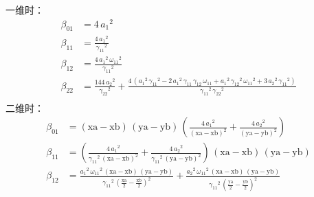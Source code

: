 \documentclass{book}
\begin{document}
一维时：
\begin{equation}
  \begin{aligned}
    \beta_{01} & = 4\,{a_1 }^2                                                                                                                                                                                                                                                                 \\
    \beta_{11} & = \frac{4\,{a_1 }^2 }{{\gamma_{11} }^2 }                                                                                                                                                                                                                                      \\
    \beta_{12} & = \frac{4\,{a_1 }^2 \,{\omega_{11} }^2 }{{\gamma_{11} }^2 }                                                                                                                                                                                                                   \\
    \beta_{22} & = \frac{144\,{a_2 }^2 }{{\gamma_{22} }^2 }+\frac{4\,{\left({a_1 }^2 \,{\gamma_{11} }^2 -2\,{a_1 }^2 \,\gamma_{11} \,\gamma_{12} \,\omega_{11} +{a_1 }^2 \,{\gamma_{12} }^2 \,{\omega_{11} }^2 +3\,{a_2 }^2 \,{\gamma_{11} }^2 \right)}}{{\gamma_{11} }^2 \,{\gamma_{22} }^2 } \\
  \end{aligned}
\end{equation}
二维时：
\begin{equation}
  \begin{aligned}
    \beta_{01} & = {\left(\mathrm{xa}-\mathrm{xb}\right)}\,{\left(\mathrm{ya}-\mathrm{yb}\right)}\,{\left(\frac{4\,{a_1 }^2 }{{{\left(\mathrm{xa}-\mathrm{xb}\right)}}^2 }+\frac{4\,{a_2 }^2 }{{{\left(\mathrm{ya}-\mathrm{yb}\right)}}^2 }\right)}                                                                                                                                                                                \\
    \beta_{11} & = {\left(\frac{4\,{a_1 }^2 }{{\gamma_{11} }^2 \,{{\left(\mathrm{xa}-\mathrm{xb}\right)}}^2 }+\frac{4\,{a_2 }^2 }{{\gamma_{11} }^2 \,{{\left(\mathrm{ya}-\mathrm{yb}\right)}}^2 }\right)}\,{\left(\mathrm{xa}-\mathrm{xb}\right)}\,{\left(\mathrm{ya}-\mathrm{yb}\right)}                                                                                                                                          \\
    \beta_{12} & = \frac{{a_1 }^2 \,{\omega_{11} }^2 \,{\left(\mathrm{xa}-\mathrm{xb}\right)}\,{\left(\mathrm{ya}-\mathrm{yb}\right)}}{{\gamma_{11} }^2 \,{{\left(\frac{\mathrm{xa}}{2}-\frac{\mathrm{xb}}{2}\right)}}^2 }+\frac{{a_2 }^2 \,{\omega_{11} }^2 \,{\left(\mathrm{xa}-\mathrm{xb}\right)}\,{\left(\mathrm{ya}-\mathrm{yb}\right)}}{{\gamma_{11} }^2 \,{{\left(\frac{\mathrm{ya}}{2}-\frac{\mathrm{yb}}{2}\right)}}^2 } \\
  \end{aligned}
\end{equation}
\end{document}
